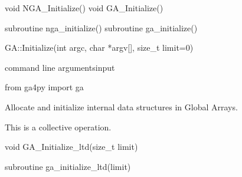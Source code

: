 \documentclass[12pt]{article}
\begin{document}

\begin{capi}
\begin{ccode}
void NGA_Initialize()
void GA_Initialize()
\end{ccode}
\end{capi}

\begin{fapi}
\begin{fcode}
subroutine nga_initialize()
subroutine ga_initialize()
\end{fcode}
\end{fapi}

\begin{cxxapi}
\begin{cxxcode}
GA::Initialize(int argc, char *argv[], size_t limit=0)
\end{cxxcode}
\begin{funcargs}
 {command line arguments}{input}
\end{funcargs}
\end{cxxapi}

\begin{pyapi}
\begin{pycode}
from ga4py import ga
\end{pycode}
\end{pyapi}

\gcoll

\begin{desc}

Allocate and initialize internal data structures in Global Arrays.

This is a collective operation.

\end{desc}


\begin{capi}
\begin{ccode}
void GA_Initialize_ltd(size_t limit)
\end{ccode}
\begin{funcargs}
\end{funcargs}
\end{capi}

\begin{fapi}
\begin{fcode}
subroutine ga_initialize_ltd(limit)
\end{fcode}
\begin{funcargs}
\end{funcargs}
\end{fapi}
\end{document}
